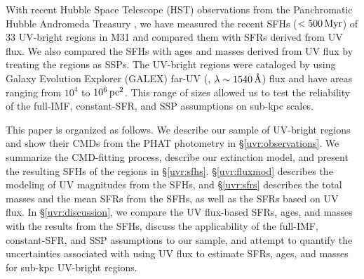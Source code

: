 With recent Hubble Space Telescope (HST) observations from the Panchromatic
Hubble Andromeda Treasury \citep[PHAT;][]{Dalcanton:2012}, we have measured the
recent SFHs ($< 500\,\mathrm{Myr}$) of 33 UV-bright regions in M31 and compared
them with SFRs derived from UV flux. We also compared the SFHs with ages and
masses derived from UV flux by treating the regions as SSPs. The UV-bright
regions were cataloged by \citet[][ hereafter]{Kang:2009} using
Galaxy Evolution Explorer (GALEX) far-UV (\fuv{}, $\lambda \sim
1540\,\textrm{\AA}$) flux and have areas ranging from $10^4$ to
$10^6\,\mathrm{pc}^2$. This range of sizes allowed us to test the reliability
of the full-IMF, constant-SFR, and SSP assumptions on sub-kpc scales.

This paper is organized as follows. We describe our sample of UV-bright regions
and show their CMDs from the PHAT photometry in \S \ref{uvr:observations}. We
summarize the CMD-fitting process, describe our extinction model, and present
the resulting SFHs of the regions in \S \ref{uvr:sfhs}. \S \ref{uvr:fluxmod} describes
the modeling of UV magnitudes from the SFHs, and \S \ref{uvr:sfrs} describes the
total masses and the mean SFRs from the SFHs, as well as the SFRs based on UV
flux. In \S \ref{uvr:discussion}, we compare the UV flux-based SFRs, ages, and
masses with the results from the SFHs, discuss the applicability of the
full-IMF, constant-SFR, and SSP assumptions to our sample, and attempt to
quantify the uncertainties associated with using UV flux to estimate SFRs,
ages, and masses for sub-kpc UV-bright regions.


